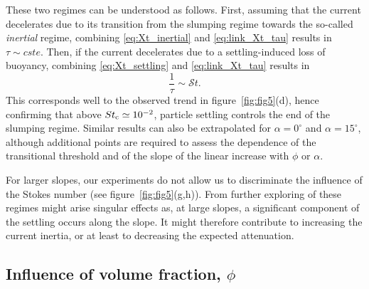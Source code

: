 \documentclass[12pt]{article}
\begin{document}
These two regimes can be understood as follows. First, assuming that the current decelerates due to its transition from the slumping regime towards the so-called \emph{inertial} regime, combining \eqref{eq:Xt_inertial} and \eqref{eq:link_Xt_tau} results in $\tau \sim cste$. Then, if the current decelerates due to a settling-induced loss of buoyancy, combining \eqref{eq:Xt_settling} and \eqref{eq:link_Xt_tau} results in
%
\begin{equation}
	\frac{1}{\tau} \sim \mathcal{S}t.
\end{equation}
%
This corresponds well to the observed trend in figure~\ref{fig:fig5}(d), hence confirming that above $St_{\text c} \simeq 10^{-2}$, particle settling controls the end of the slumping regime. Similar results can also be extrapolated for $\alpha = 0^\circ$ and $\alpha = 15^\circ$, although additional points are required to assess the dependence of the transitional threshold and of the slope of the linear increase with $\phi$ or $\alpha$.

For larger slopes, our experiments do not allow us to discriminate the influence of the Stokes number (see figure~\ref{fig:fig5}(g,h)). From further exploring of these regimes might arise singular effects as, at large slopes, a significant component of the settling occurs along the slope. It might therefore contribute to increasing the current inertia, or at least to decreasing the expected attenuation.

\subsection{Influence of volume fraction, $\phi$}
\label{sec:influence_phi}
\end{document}
